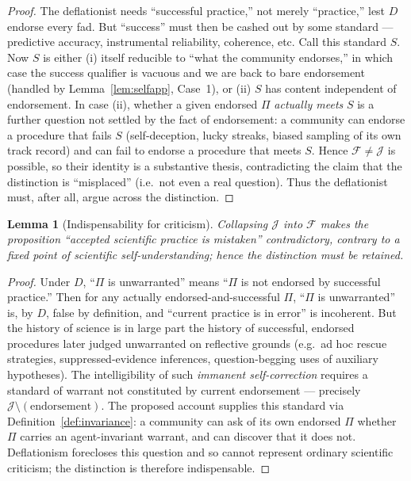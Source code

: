 \documentclass{amsart}
\theoremstyle{definition}
\theoremstyle{plain}
\newtheorem{lemma}{Lemma}
\begin{document}
\begin{proof}
The deflationist needs ``successful practice,'' not merely ``practice,'' lest
$D$ endorse every fad. But ``success'' must then be cashed out by some
standard --- predictive accuracy, instrumental reliability, coherence, etc.
Call this standard $S$. Now $S$ is either (i) itself reducible to ``what the
community endorses,'' in which case the success qualifier is vacuous and we are
back to bare endorsement (handled by Lemma~\ref{lem:selfapp}, Case~1), or (ii)
$S$ has content independent of endorsement. In case (ii), whether a given
endorsed $\Pi$ \emph{actually meets} $S$ is a further question not settled by
the fact of endorsement: a community can endorse a procedure that fails $S$
(self-deception, lucky streaks, biased sampling of its own track record) and
can fail to endorse a procedure that meets $S$. Hence
$\mathcal{F}\neq\mathcal{J}$ is possible, so their identity is a substantive
thesis, contradicting the claim that the distinction is ``misplaced'' (i.e.\
not even a real question). Thus the deflationist must, after all, argue across
the distinction.
\end{proof}

\begin{lemma}[Indispensability for criticism]\label{lem:criticism}
Collapsing $\mathcal{J}$ into $\mathcal{F}$ makes the proposition ``accepted
scientific practice is mistaken'' contradictory, contrary to a fixed point of
scientific self-understanding; hence the distinction must be retained.
\end{lemma}

\begin{proof}
Under $D$, ``$\Pi$ is unwarranted'' means ``$\Pi$ is not endorsed by successful
practice.'' Then for any actually endorsed-and-successful $\Pi$, ``$\Pi$ is
unwarranted'' is, by $D$, false by definition, and ``current practice is in
error'' is incoherent. But the history of science is in large part the history
of successful, endorsed procedures later judged unwarranted on reflective
grounds (e.g.\ ad hoc rescue strategies, suppressed-evidence inferences,
question-begging uses of auxiliary hypotheses). The intelligibility of such
\emph{immanent self-correction} requires a standard of warrant not constituted
by current endorsement --- precisely $\mathcal{J}\setminus(\text{endorsement})$.
The proposed account supplies this standard via
Definition~\ref{def:invariance}: a community can ask of its own endorsed $\Pi$
whether $\Pi$ carries an agent-invariant warrant, and can discover that it does
not. Deflationism forecloses this question and so cannot represent ordinary
scientific criticism; the distinction is therefore indispensable.
\end{proof}
\end{document}
